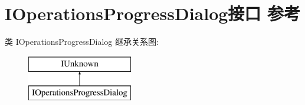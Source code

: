 \hypertarget{interface_i_operations_progress_dialog}{}\section{I\+Operations\+Progress\+Dialog接口 参考}
\label{interface_i_operations_progress_dialog}
类 I\+Operations\+Progress\+Dialog 继承关系图\+:\begin{figure}[H]
\begin{center}
\leavevmode
\includegraphics[height=2.000000cm]{interface_i_operations_progress_dialog}
\end{center}
\end{figure}
